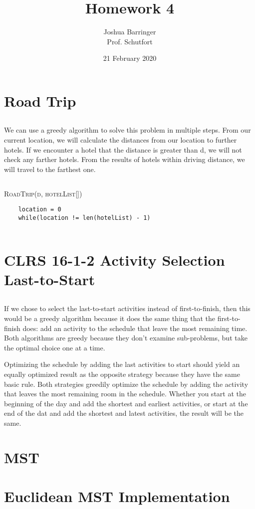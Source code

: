 \documentclass{article}
\title{Homework 4}
\author{Joshua Barringer \\ Prof. Schutfort }
\date{21 February 2020}
\begin{document}
\maketitle

\section{Road Trip}

\subsection{}{}{}
We can use a greedy algorithm to solve this problem in multiple steps.  From our current location, we will calculate the distances from our location to further hotels.  If we encounter a hotel that the distance is greater than d, we will not check any farther hotels.  From the results of hotels within driving distance, we will travel to the farthest one.

\subsection{}{}{}
\textsc{RoadTrip(d, hotelList[])}
\begin{verbatim}
    location = 0
    while(location != len(hotelList) - 1)
        
\end{verbatim}

\section{CLRS 16-1-2 Activity Selection Last-to-Start}

\subsection{}{}{}

If we chose to select the last-to-start activities instead of first-to-finish, then this would be a greedy algorithm because it does the same thing that the first-to-finish does: add an activity to the schedule that leave the most remaining time.  Both algorithms are greedy because they don't examine sub-problems, but take the optimal choice one at a time.

Optimizing the schedule by adding the last activities to start should yield an equally optimized result as the opposite strategy because they have the same basic rule.  Both strategies greedily optimize the schedule by adding the activity that leaves the most remaining room in the schedule.  Whether you start at the beginning of the day and add the shortest and earliest activities, or start at the end of the dat and add the shortest and latest activities, the result will be the same.

\section{MST}

\section{Euclidean MST Implementation}
\end{document}
